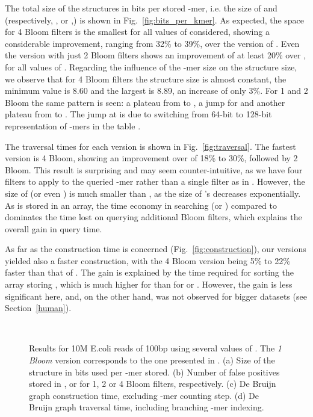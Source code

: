 \documentclass[pdftex]{llncs}\usepackage[T1]{fontenc}
\begin{document}
The total size of the structures in bits per stored -mer, i.e. the size of
 and  (respectively, , or ,)
is shown in
Fig.~\ref{fig:bits_per_kmer}. As expected, the space for 4 Bloom
filters is the smallest for all values of  considered, showing a
considerable improvement, ranging from 32\% to 39\%, over
the version of \cite{DBLP:conf/wabi/ChikhiR12}. Even the version with
just 2 Bloom filters shows
an improvement of at least 20\% over \cite{DBLP:conf/wabi/ChikhiR12}, for all
values of . Regarding the influence of the -mer size on the
structure size, we observe that for 4 Bloom filters the structure size
is almost constant, the minimum value is 8.60 and the largest is 8.89,
an increase of only 3\%. For 1 and 2 Bloom the same pattern is seen: a
plateau from  to , a jump for  and another plateau
from  to . The jump at  is due to switching from
64-bit to 128-bit representation of -mers in the table . 

The traversal times for each version is shown in
Fig.~\ref{fig:traversal}. 
The fastest version is 4 Bloom, showing an improvement over \cite{DBLP:conf/wabi/ChikhiR12} 
of 18\% to 30\%, followed by 2 Bloom. 
This result is surprising and may seem counter-intuitive, as we have
four filters to apply to the queried -mer rather than a single
filter as in \cite{DBLP:conf/wabi/ChikhiR12}. However, the size of
 (or even ) is much smaller than , as the size of
's decreases exponentially. As  is stored in an array, the time economy in searching 
(or ) compared to  dominates the time lost on querying
additional Bloom filters, which explains the overall gain in query time. 

As far as the construction time is concerned
(Fig.~\ref{fig:construction}), our versions yielded also a faster
construction, with the 4 Bloom version being 5\% to 22\% faster than
that of \cite{DBLP:conf/wabi/ChikhiR12}. The gain is explained by the
time required for sorting the array storing , which is much
higher for  than for  or . However, the gain is less significant
here, and, on the other hand, was not observed for bigger datasets (see
Section~\ref{human}). 


\begin{figure}[Htbp]
  \center
   \\
  \caption{Results for 10M E.coli reads of 100bp using several values
    of . The \emph{1 Bloom} version corresponds to the one
    presented in \cite{DBLP:conf/wabi/ChikhiR12}. (a) Size of the
    structure in bits used per -mer stored. (b)
    Number of false positives stored in ,  or  for 1, 2
    or 4 Bloom filters, respectively. (c) De Bruijn graph
    construction time, excluding -mer counting step. (d) De Bruijn
    graph traversal time, including branching -mer indexing. }  \label{fig:ecoli}
\end{figure}
\end{document}
